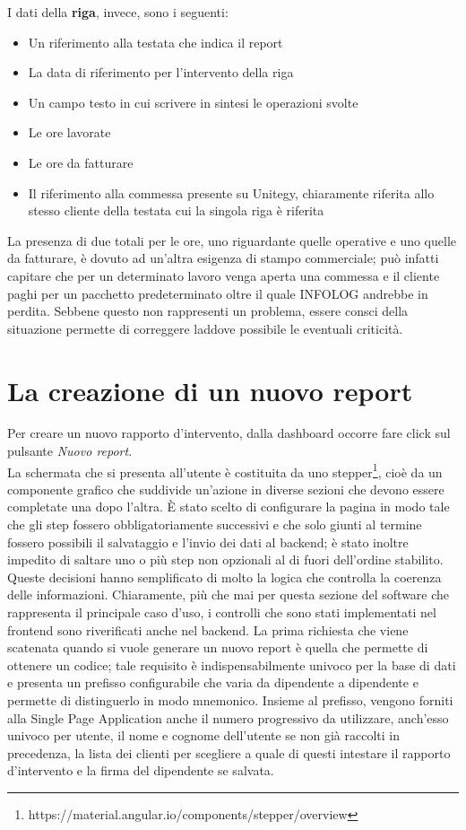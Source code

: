 I dati della \textbf{riga}, invece, sono i seguenti:
\begin{itemize}
    \item Un riferimento alla testata che indica il report
    \item La data di riferimento per l'intervento della riga
    \item Un campo testo in cui scrivere in sintesi le operazioni svolte
    \item Le ore lavorate
    \item Le ore da fatturare
    \item Il riferimento alla commessa presente su Unitegy, chiaramente riferita allo stesso cliente della testata cui la singola riga è riferita
\end{itemize}
La presenza di due totali per le ore, uno riguardante quelle operative e uno quelle da fatturare, è dovuto ad un'altra esigenza di stampo commerciale; può infatti capitare che per
un determinato lavoro venga aperta una commessa e il cliente paghi per un pacchetto predeterminato oltre il quale INFOLOG andrebbe in perdita. Sebbene questo non rappresenti un
problema, essere consci della situazione permette di correggere laddove possibile le eventuali criticità.

\section{La creazione di un nuovo report}

Per creare un nuovo rapporto d'intervento, dalla dashboard occorre fare click sul pulsante \emph{Nuovo report}.
\\
La schermata che si presenta all'utente è costituita da uno stepper\footnote{https://material.angular.io/components/stepper/overview}, cioè da un componente grafico che suddivide
un'azione in diverse sezioni che devono essere completate una dopo l'altra.
È stato scelto di configurare la pagina in modo tale che gli step fossero obbligatoriamente successivi e che solo giunti al termine fossero possibili il salvataggio e l'invio dei dati
al backend; è stato inoltre impedito di saltare uno o più step non opzionali al di fuori dell'ordine stabilito.
Queste decisioni hanno semplificato di molto la logica che controlla la coerenza delle informazioni.
Chiaramente, più che mai per questa sezione del software che rappresenta il principale caso d'uso, i controlli che sono stati implementati nel frontend sono riverificati anche nel
backend.
La prima richiesta che viene scatenata quando si vuole generare un nuovo report è quella che permette di ottenere un codice; tale requisito è indispensabilmente univoco per la base
di dati e presenta un prefisso configurabile che varia da dipendente a dipendente e permette di distinguerlo in modo mnemonico.
Insieme al prefisso, vengono forniti alla Single Page Application anche il numero progressivo da utilizzare, anch'esso univoco per utente, il nome e cognome dell'utente se non già
raccolti in precedenza, la lista dei clienti per scegliere a quale di questi intestare il rapporto d'intervento e la firma del dipendente se salvata.